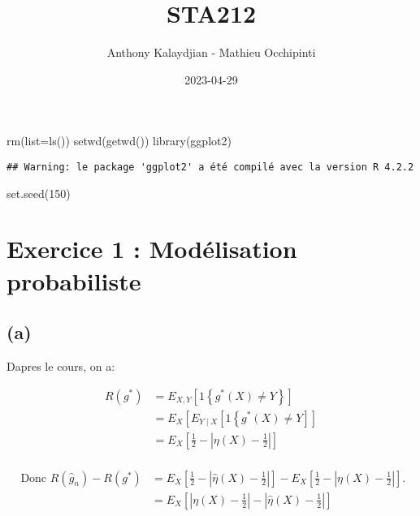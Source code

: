 \documentclass[
]{article}
\title{STA212}
\author{Anthony Kalaydjian - Mathieu Occhipinti}
\date{2023-04-29}
\newenvironment{Shaded}{\begin{snugshade}}{\end{snugshade}}
\newcommand{\AttributeTok}[1]{\textcolor[rgb]{0.77,0.63,0.00}{#1}}
\newcommand{\DecValTok}[1]{\textcolor[rgb]{0.00,0.00,0.81}{#1}}
\newcommand{\FunctionTok}[1]{\textcolor[rgb]{0.00,0.00,0.00}{#1}}
\newcommand{\NormalTok}[1]{#1}
\begin{document}
\maketitle

\begin{Shaded}
\begin{Highlighting}[]
\FunctionTok{rm}\NormalTok{(}\AttributeTok{list=}\FunctionTok{ls}\NormalTok{())}
\FunctionTok{setwd}\NormalTok{(}\FunctionTok{getwd}\NormalTok{())}
\FunctionTok{library}\NormalTok{(ggplot2)}
\end{Highlighting}
\end{Shaded}

\begin{verbatim}
## Warning: le package 'ggplot2' a été compilé avec la version R 4.2.2
\end{verbatim}

\begin{Shaded}
\begin{Highlighting}[]
\FunctionTok{set.seed}\NormalTok{(}\DecValTok{150}\NormalTok{)}
\end{Highlighting}
\end{Shaded}

\hypertarget{exercice-1-moduxe9lisation-probabiliste}{%
\section{Exercice 1 : Modélisation
probabiliste}\label{exercice-1-moduxe9lisation-probabiliste}}

\hypertarget{a}{%
\subsection{(a)}\label{a}}

Dapres le cours, on a:

\begin{align*}
R\left(g^*\right) &=E_{X, Y}\left[1\left\{g^*(X) \neq Y\right\}\right]\\
&=E_X\left[E_{Y \mid X}\left[{1}\left\{g^*(X)\neq Y\right]\right]\right. \\
&=E_X\left[\frac{1}{2}-\left| \eta (X)-\frac{1}{2} \right|\right] \\
\end{align*}

\begin{align*}
\text { Donc } R\left(\hat{g}_n\right)-R\left(g^*\right)& =E_X\left[\frac{1}{2}-\left|\hat{\eta}(X)-\frac{1}{2}\right|\right]-E_X\left[\frac{1}{2}-\left|\eta(X)-\frac{1}{2}\right|\right]. \\
& =E_X\left[\left|\eta(X)-\frac{1}{2}\right|-\left|\hat{\eta}(X)-\frac{1}{2}\right|\right] \\
\end{align*}
\end{document}
